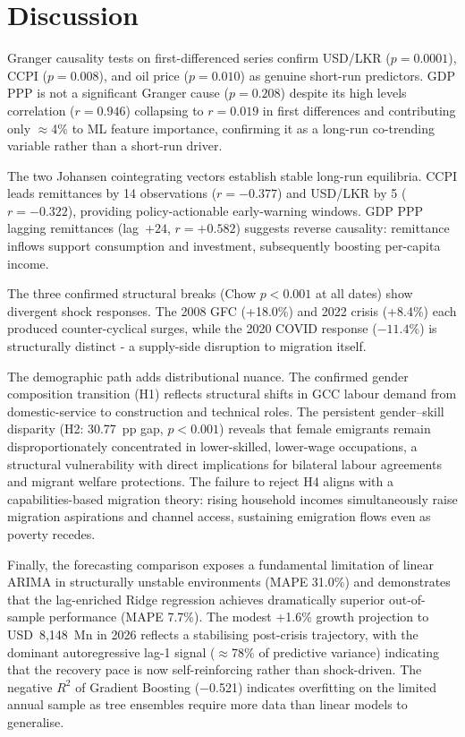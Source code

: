 \documentclass[sigconf]{acmart}
\begin{document}
\section{Discussion}

Granger causality tests on first-differenced series confirm USD/LKR ($p=0.0001$), CCPI ($p=0.008$), and oil price ($p=0.010$) as genuine short-run predictors. GDP PPP is not a significant Granger cause ($p=0.208$) despite its high levels correlation ($r=0.946$) collapsing to $r=0.019$ in first differences and contributing only $\approx$4\% to ML feature importance, confirming it as a long-run co-trending variable rather than a short-run driver.

The two Johansen cointegrating vectors establish stable long-run equilibria. CCPI leads remittances by 14 observations ($r=-0.377$) and USD/LKR by 5 ($r=-0.322$), providing policy-actionable early-warning windows. GDP PPP lagging remittances (lag~$+24$, $r=+0.582$) suggests reverse causality: remittance inflows support consumption and investment, subsequently boosting per-capita income.

The three confirmed structural breaks (Chow $p<0.001$ at all dates) show divergent shock responses. The 2008 GFC (+18.0\%) and 2022 crisis (+8.4\%) each produced counter-cyclical surges, while the 2020 COVID response ($-11.4\%$) is structurally distinct - a supply-side disruption to migration itself.

The demographic path adds distributional nuance. The confirmed gender composition transition (H1) reflects structural shifts in GCC labour demand from domestic-service to construction and technical roles. The persistent gender--skill disparity (H2: 30.77~pp gap, $p<0.001$) reveals that female emigrants remain disproportionately concentrated in lower-skilled, lower-wage occupations, a structural vulnerability with direct implications for bilateral labour agreements and migrant welfare protections. The failure to reject H4 aligns with a capabilities-based migration theory: rising household incomes simultaneously raise migration aspirations and channel access, sustaining emigration flows even as poverty recedes.

Finally, the forecasting comparison exposes a fundamental limitation of linear ARIMA in structurally unstable environments (MAPE 31.0\%) and demonstrates that the lag-enriched Ridge regression achieves dramatically superior out-of-sample performance (MAPE 7.7\%). The modest +1.6\% growth projection to USD~8,148~Mn in 2026 reflects a stabilising post-crisis trajectory, with the dominant autoregressive lag-1 signal ($\approx$78\% of predictive variance) indicating that the recovery pace is now self-reinforcing rather than shock-driven. The negative $R^2$ of Gradient Boosting ($-$0.521) indicates overfitting on the limited annual sample as tree ensembles require more data than linear models to generalise.
\end{document}
